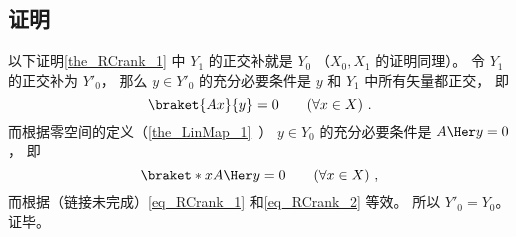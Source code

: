 \subsection{证明}
以下证明\autoref{the_RCrank_1} 中 $Y_1$ 的正交补就是 $Y_0$ （$X_0, X_1$ 的证明同理）。 令 $Y_1$ 的正交补为 $Y'_0$， 那么 $y \in Y'_0$ 的充分必要条件是 $y$ 和 $Y_1$ 中所有矢量都正交， 即
\begin{equation}\label{eq_RCrank_1}
\braket{Ax}{y} = 0 \qquad (\forall x \in X)~.
\end{equation}
而根据零空间的定义（\autoref{the_LinMap_1}~） $y \in Y_0$ 的充分必要条件是 $A\Her y = 0$， 即
\begin{equation}\label{eq_RCrank_2}
\braket*{x}{A\Her y} = 0 \qquad (\forall x \in X)~,
\end{equation}
而根据（链接未完成）\autoref{eq_RCrank_1} 和\autoref{eq_RCrank_2} 等效。 所以 $Y'_0 = Y_0$。 证毕。
